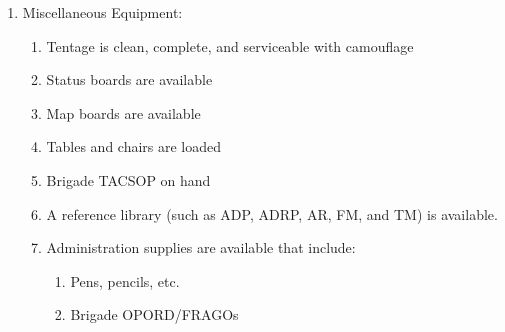 \documentclass{article}
\begin{document}
\begin{enumerate}
\begin{enumerate}
\item Miscellaneous Equipment:
\begin{enumerate}
\item	Tentage is clean, complete, and serviceable with camouflage
\item	Status boards are available
\item	Map boards are available
\item	Tables and chairs are loaded
\item	Brigade TACSOP on hand
\item	A reference library (such as ADP, ADRP, AR, FM, and TM) is available.
\item	Administration supplies are available that include:
\begin{enumerate}
    \item	Pens, pencils, etc.
\item Brigade OPORD/FRAGOs
\end{enumerate}
\end{enumerate}
\end{enumerate}
\end{enumerate}

\newpage
\end{document}
